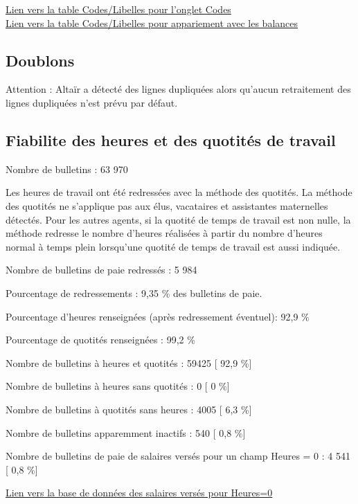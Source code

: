 \href{../Bases/Fiabilite/code.libelle.short.csv}{Lien vers la table
Codes/Libelles pour l'onglet Codes}\\
\href{../Bases/Fiabilite/code.libelle.csv}{Lien vers la table
Codes/Libelles pour appariement avec les balances}

\hypertarget{doublons}{%
\subsection{Doublons}\label{doublons}}

Attention : Altaïr a détecté des lignes dupliquées alors qu'aucun
retraitement des lignes dupliquées n'est prévu par défaut.

\hypertarget{fiabilite-des-heures-et-des-quotites-de-travail}{%
\subsection{Fiabilite des heures et des quotités de
travail}\label{fiabilite-des-heures-et-des-quotites-de-travail}}

Nombre de bulletins : 63 970

Les heures de travail ont été redressées avec la méthode des quotités.
La méthode des quotités ne s'applique pas aux élus, vacataires et
assistantes maternelles détectés. Pour les autres agents, si la quotité
de temps de travail est non nulle, la méthode redresse le nombre
d'heures réalisées à partir du nombre d'heures normal à temps plein
lorsqu'une quotité de temps de travail est aussi indiquée.

Nombre de bulletins de paie redressés : 5 984

Pourcentage de redressements : 9,35 \% des bulletins de paie.

Pourcentage d'heures renseignées (après redressement éventuel): 92,9 \%

Pourcentage de quotités renseignées : 99,2 \%

Nombre de bulletins à heures et quotités : 59425 {[} 92,9 \%{]}

Nombre de bulletins à heures sans quotités : 0 {[} 0 \%{]}

Nombre de bulletins à quotités sans heures : 4005 {[} 6,3 \%{]}

Nombre de bulletins apparemment inactifs : 540 {[} 0,8 \%{]}

Nombre de bulletins de paie de salaires versés pour un champ Heures = 0
: 4 541 {[} 0,8 \%{]}

\href{../Bases/Fiabilite/base.heures.nulles.salaire.nonnull.csv}{Lien vers
la base de données des salaires versés pour Heures=0}

